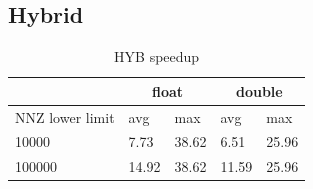 \documentclass{article}
\begin{document}
\begin{figure}[H]
\centering
{}
\qquad %
\end{figure}


\subsection{Hybrid}

\begin{table}[H]
	\centering
	\begin{tabular}{ |p{2.6cm}||p{1cm}|p{1cm}|p{1cm}|p{1cm}|  }
	 \hline
		& \multicolumn{2}{|c|}{float} & \multicolumn{2}{|c|}{double}\\
	 \hline
	 NNZ lower limit & avg & max & avg & max  \\
	 \hline
	 10000  & 7.73  & 38.62 & 6.51  & 25.96 \\
	 100000 & 14.92 & 38.62 & 11.59 & 25.96 \\
	 \hline
	\end{tabular}
	\caption{HYB speedup}
  \label{hyb_speedup_table}
\end{table}
\end{document}
